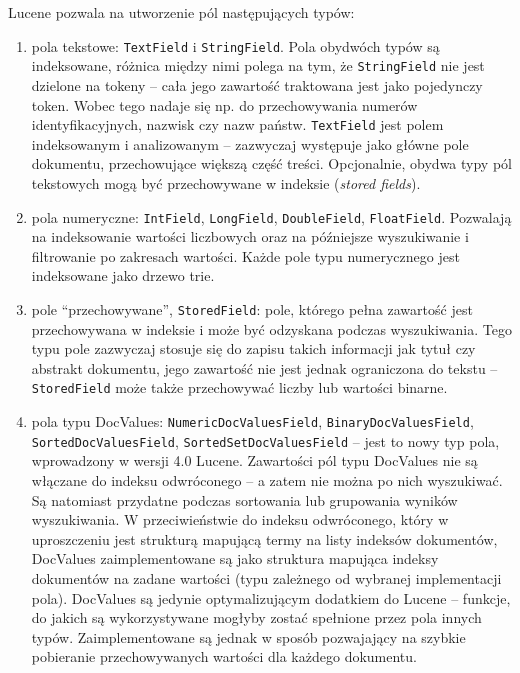 Lucene pozwala na utworzenie pól następujących typów:
\begin{enumerate}
 \item pola tekstowe: \texttt{TextField} i \texttt{StringField}. Pola obydwóch typów są indeksowane, różnica między nimi polega na tym, że \texttt{StringField} nie jest dzielone na tokeny -- cała jego zawartość traktowana jest jako pojedynczy token. Wobec tego nadaje się np. do przechowywania numerów identyfikacyjnych, nazwisk czy nazw państw. \texttt{TextField} jest polem indeksowanym i analizowanym -- zazwyczaj występuje jako główne pole dokumentu, przechowujące większą część treści. Opcjonalnie, obydwa typy pól tekstowych mogą być przechowywane w indeksie (\emph{stored fields}).
 \item pola numeryczne: \texttt{IntField}, \texttt{LongField}, \texttt{DoubleField}, \texttt{FloatField}. Pozwalają na indeksowanie wartości liczbowych oraz na późniejsze wyszukiwanie i filtrowanie po zakresach wartości. Każde pole typu numerycznego jest indeksowane jako drzewo trie.
 \item pole ``przechowywane'', \texttt{StoredField}: pole, którego pełna zawartość jest przechowywana w indeksie i może być odzyskana podczas wyszukiwania. Tego typu pole zazwyczaj stosuje się do zapisu takich informacji jak tytuł czy abstrakt dokumentu, jego zawartość nie jest jednak ograniczona do tekstu -- \texttt{StoredField} może także przechowywać liczby lub wartości binarne.
 \item pola typu DocValues: \texttt{NumericDocValuesField}, \texttt{BinaryDocValuesField}, \texttt{SortedDocValuesField}, \texttt{SortedSetDocValuesField} -- jest to nowy typ pola, wprowadzony w wersji 4.0 Lucene. Zawartości pól typu DocValues nie są włączane do indeksu odwróconego -- a zatem nie można po nich wyszukiwać. Są natomiast przydatne podczas sortowania lub grupowania wyników wyszukiwania. W przeciwieństwie do indeksu odwróconego, który w uproszczeniu jest strukturą mapującą termy na listy indeksów dokumentów, DocValues zaimplementowane są jako struktura mapująca indeksy dokumentów na zadane wartości (typu zależnego od wybranej implementacji pola). DocValues są jedynie optymalizującym dodatkiem do Lucene -- funkcje, do jakich są wykorzystywane mogłyby zostać spełnione przez pola innych typów. Zaimplementowane są jednak w sposób pozwajający na szybkie pobieranie przechowywanych wartości dla każdego dokumentu.
\end{enumerate}
